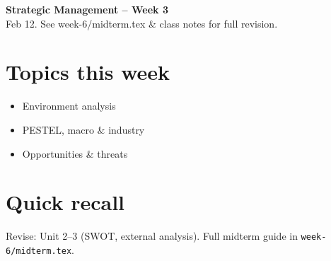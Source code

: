 \documentclass[10pt,a4paper]{article}
\begin{document}
\begin{center}
{\large\bfseries\color{eublue} Strategic Management -- Week 3}\\[0.2em]
\footnotesize Feb 12. See week-6/midterm.tex \& class notes for full revision.
\end{center}\vspace{0.5em}

\section*{\color{eublue}Topics this week}
\begin{itemize}
\item Environment analysis
\item PESTEL, macro \& industry
\item Opportunities \& threats
\end{itemize}

\section*{Quick recall}
Revise: Unit 2--3 (SWOT, external analysis). Full midterm guide in \texttt{week-6/midterm.tex}.
\end{document}
